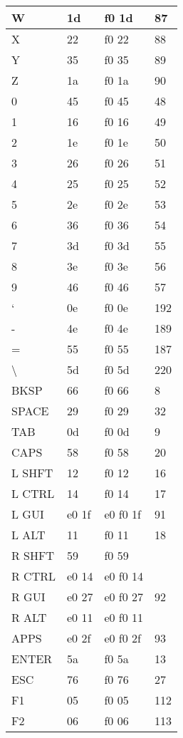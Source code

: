 \begin{longtable}{| p{} | p{} | p{} | p{} |}
  W & 1d & f0 1d & 87 \\ \hline
  X & 22 & f0 22 & 88 \\ \hline
  Y & 35 & f0 35 & 89 \\ \hline
  Z & 1a & f0 1a & 90 \\ \hline
  0 & 45 & f0 45 & 48 \\ \hline
  1 & 16 & f0 16 & 49 \\ \hline
  2 & 1e & f0 1e & 50 \\ \hline
  3 & 26 & f0 26 & 51 \\ \hline
  4 & 25 & f0 25 & 52 \\ \hline
  5 & 2e & f0 2e & 53 \\ \hline
  6 & 36 & f0 36 & 54 \\ \hline
  7 & 3d & f0 3d & 55 \\ \hline
  8 & 3e & f0 3e & 56 \\ \hline
  9 & 46 & f0 46 & 57 \\ \hline
  ‘ & 0e & f0 0e & 192 \\ \hline
  - & 4e & f0 4e & 189 \\ \hline
  = & 55 & f0 55 & 187 \\ \hline
  \textbackslash & 5d & f0 5d & 220 \\ \hline
  BKSP & 66 & f0 66 & 8 \\ \hline
  SPACE & 29 & f0 29 & 32 \\ \hline
  TAB & 0d & f0 0d & 9 \\ \hline
  CAPS & 58 & f0 58 & 20 \\ \hline
  L SHFT & 12 & f0 12 & 16 \\ \hline
  L CTRL & 14 & f0 14 & 17 \\ \hline
  L GUI & e0 1f & e0 f0 1f & 91 \\ \hline
  L ALT & 11 & f0 11 & 18 \\ \hline
  R SHFT & 59 & f0 59 &   \\ \hline
  R CTRL & e0 14 & e0 f0 14 &   \\ \hline
  R GUI & e0 27 & e0 f0 27 & 92 \\ \hline
  R ALT & e0 11 & e0 f0 11 &   \\ \hline
  APPS & e0 2f & e0 f0 2f & 93 \\ \hline
  ENTER & 5a & f0 5a & 13 \\ \hline
  ESC & 76 & f0 76 & 27 \\ \hline
  F1 & 05 & f0 05 & 112 \\ \hline
  F2 & 06 & f0 06 & 113 \\ \hline

\end{longtable}
